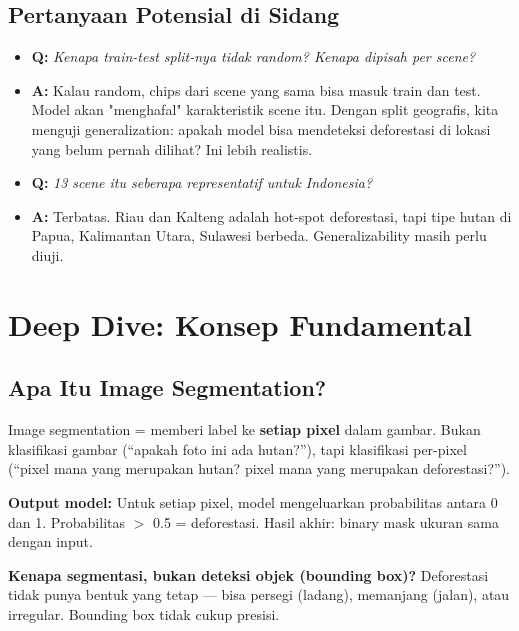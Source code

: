 \documentclass[10pt,a4paper,onecolumn]{article}
\begin{document}
\subsection{Pertanyaan Potensial di Sidang}

\begin{itemize}
    \item{\textbf{Q:} \textit{Kenapa train-test split-nya tidak
          random? Kenapa dipisah per scene?}}
    \item{\textbf{A:} Kalau random, chips dari scene yang sama bisa
          masuk train dan test. Model akan "menghafal" karakteristik
          scene itu. Dengan split geografis, kita menguji
          generalization: apakah model bisa mendeteksi deforestasi
          di lokasi yang belum pernah dilihat? Ini lebih realistis.}
\end{itemize}

\begin{itemize}
    \item{\textbf{Q:} \textit{13 scene itu seberapa representatif
          untuk Indonesia?}}
    \item{\textbf{A:} Terbatas. Riau dan Kalteng adalah hot-spot
          deforestasi, tapi tipe hutan di Papua, Kalimantan Utara,
          Sulawesi berbeda. Generalizability masih perlu diuji.} 
\end{itemize}

\section{Deep Dive: Konsep Fundamental}

\subsection{Apa Itu Image Segmentation?}
Image segmentation = memberi label ke \textbf{setiap pixel} dalam
gambar. Bukan klasifikasi gambar (``apakah foto ini ada hutan?''),
tapi klasifikasi per-pixel (``pixel mana yang merupakan hutan? pixel
mana yang merupakan deforestasi?'').

\textbf{Output model:} Untuk setiap pixel, model mengeluarkan
probabilitas antara 0 dan 1. Probabilitas $>$ 0.5 = deforestasi.
Hasil akhir: binary mask ukuran sama dengan input.

\textbf{Kenapa segmentasi, bukan deteksi objek (bounding box)?}
Deforestasi tidak punya bentuk yang tetap — bisa persegi (ladang),
memanjang (jalan), atau irregular. Bounding box tidak cukup presisi.
\end{document}
